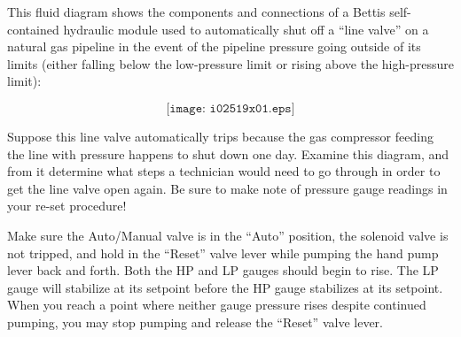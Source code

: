 

This fluid diagram shows the components and connections of a Bettis self-contained hydraulic module used to automatically shut off a ``line valve'' on a natural gas pipeline in the event of the pipeline pressure going outside of its limits (either falling below the low-pressure limit or rising above the high-pressure limit):

$$\texttt{[image: i02519x01.eps]}$$

Suppose this line valve automatically trips because the gas compressor feeding the line with pressure happens to shut down one day.  Examine this diagram, and from it determine what steps a technician would need to go through in order to get the line valve open again.  Be sure to make note of pressure gauge readings in your re-set procedure!







Make sure the Auto/Manual valve is in the ``Auto'' position, the solenoid valve is not tripped, and hold in the ``Reset'' valve lever while pumping the hand pump lever back and forth.  Both the HP and LP gauges should begin to rise.  The LP gauge will stabilize at its setpoint before the HP gauge stabilizes at its setpoint.  When you reach a point where neither gauge pressure rises despite continued pumping, you may stop pumping and release the ``Reset'' valve lever.











